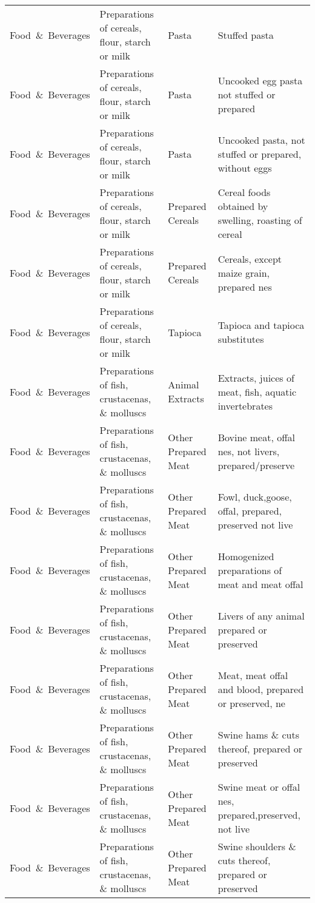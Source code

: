 \begin{appendices}
\begin{xltabular}{\textwidth}{|p{0.10\textwidth}|p{0.30\textwidth}|p{0.20\textwidth}|p{0.30\textwidth}|}
		Food\ \&\ Beverages & Preparations of cereals, flour, starch or milk & Pasta & Stuffed pasta \\
		Food\ \&\ Beverages & Preparations of cereals, flour, starch or milk & Pasta & Uncooked egg pasta not stuffed or prepared \\
		Food\ \&\ Beverages & Preparations of cereals, flour, starch or milk & Pasta & Uncooked pasta, not stuffed or prepared, without eggs \\
		Food\ \&\ Beverages & Preparations of cereals, flour, starch or milk & Prepared Cereals & Cereal foods obtained by swelling, roasting of cereal \\
		Food\ \&\ Beverages & Preparations of cereals, flour, starch or milk & Prepared Cereals & Cereals, except maize grain, prepared nes \\
		Food\ \&\ Beverages & Preparations of cereals, flour, starch or milk & Tapioca & Tapioca and tapioca substitutes \\
		Food\ \&\ Beverages & Preparations of fish, crustacenas, \& molluscs & Animal Extracts & Extracts, juices of meat, fish, aquatic invertebrates \\
		Food\ \&\ Beverages & Preparations of fish, crustacenas, \& molluscs & Other Prepared Meat & Bovine meat, offal nes, not livers, prepared/preserve \\
		Food\ \&\ Beverages & Preparations of fish, crustacenas, \& molluscs & Other Prepared Meat & Fowl, duck,goose, offal, prepared, preserved not live \\
		Food\ \&\ Beverages & Preparations of fish, crustacenas, \& molluscs & Other Prepared Meat & Homogenized preparations of meat and meat offal \\
		Food\ \&\ Beverages & Preparations of fish, crustacenas, \& molluscs & Other Prepared Meat & Livers of any animal prepared or preserved \\
		Food\ \&\ Beverages & Preparations of fish, crustacenas, \& molluscs & Other Prepared Meat & Meat, meat offal and blood, prepared or preserved, ne \\
		Food\ \&\ Beverages & Preparations of fish, crustacenas, \& molluscs & Other Prepared Meat & Swine hams \& cuts thereof, prepared or preserved \\
		Food\ \&\ Beverages & Preparations of fish, crustacenas, \& molluscs & Other Prepared Meat & Swine meat or offal nes, prepared,preserved, not live \\
		Food\ \&\ Beverages & Preparations of fish, crustacenas, \& molluscs & Other Prepared Meat & Swine shoulders \& cuts thereof, prepared or preserved \\

\end{xltabular}
\end{appendices}
